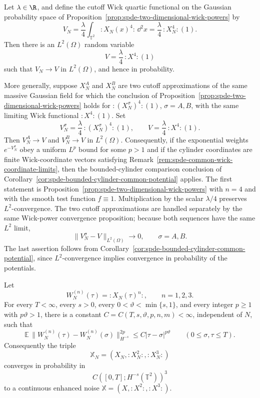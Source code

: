 \begin{remark}
\label{rem:spde-wick-quartic-potential-convergence}
Let \(\lambda\in\R\), and define the cutoff Wick quartic functional on the
Gaussian probability space of
Proposition~\ref{prop:spde-two-dimensional-wick-powers} by
\[
  V_N=\frac{\lambda}{4}\int_{\mathbb T^2}:\!X_N(x)^4\!:\,\dd^2x
  =
  \frac{\lambda}{4}\,:\!X_N^4\!:(1).
\]
Then there is an \(L^2(\Omega)\) random variable
\[
  V=\frac{\lambda}{4}\,:\!X^4\!:(1)
\]
such that \(V_N\to V\) in \(L^2(\Omega)\), and hence in probability.

More generally, suppose \(X_N^A\) and \(X_N^B\) are two cutoff
approximations of the same massive Gaussian field for which the conclusion
of Proposition~\ref{prop:spde-two-dimensional-wick-powers} holds for
\(:\!(X_N^\sigma)^4\!:(1)\), \(\sigma=A,B\), with the same limiting Wick
functional \(:\!X^4\!:(1)\).  Set
\[
  V_N^\sigma=\frac{\lambda}{4}\,:\!(X_N^\sigma)^4\!:(1),
  \qquad
  V=\frac{\lambda}{4}\,:\!X^4\!:(1).
\]
Then \(V_N^A\to V\) and \(V_N^B\to V\) in \(L^2(\Omega)\).  Consequently,
if the exponential weights \(e^{-V_N^\sigma}\) obey a uniform \(L^p\) bound
for some \(p>1\) and if the cylinder coordinates are finite Wick-coordinate
vectors satisfying
Remark~\ref{rem:spde-common-wick-coordinate-limits}, then the
bounded-cylinder comparison conclusion of
Corollary~\ref{cor:spde-bounded-cylinder-common-potential} applies.
The first statement is Proposition~\ref{prop:spde-two-dimensional-wick-powers}
with \(n=4\) and with the smooth test function \(f\equiv1\).  Multiplication
by the scalar \(\lambda/4\) preserves \(L^2\)-convergence.  The
two cutoff approximations are handled separately by the same Wick-power
convergence proposition; because both sequences have the same \(L^2\) limit,
\[
  \|V_N^\sigma-V\|_{L^2(\Omega)}\longrightarrow0,
  \qquad \sigma=A,B.
\]
The last assertion follows from
Corollary~\ref{cor:spde-bounded-cylinder-common-potential}, since
\(L^2\)-convergence implies convergence in probability of the potentials.
\end{remark}

\begin{proposition}
\label{prop:spde-two-dimensional-enhanced-noise-path-convergence}
Let
\[
  W_N^{(n)}(\tau)=:\!X_N(\tau)^n\!:,
  \qquad n=1,2,3 .
\]
For every \(T<\infty\), every \(s>0\), every
\(0<\vartheta<\min\{s,1\}\), and every integer \(p\geq1\) with
\(p\vartheta>1\), there is a constant
\(C=C(T,s,\vartheta,p,n,m)<\infty\), independent of \(N\), such that
\begin{equation}
  \mathbb E\,
  \|W_N^{(n)}(\tau)-W_N^{(n)}(\sigma)\|_{H^{-s}}^{2p}
  \leq
  C|\tau-\sigma|^{p\vartheta}
  \qquad
  (0\leq\sigma,\tau\leq T).
  \label{eq:spde-two-dimensional-wick-path-increment-bound}
\end{equation}
Consequently the triple
\[
  \mathbb X_N=(X_N,:\!X_N^2\!:,:\!X_N^3\!:)
\]
converges in probability in
\[
  C([0,T];H^{-s}(\mathbb T^2))^3
\]
to a continuous enhanced noise
\(\mathbb X=(X,:\!X^2\!:,:\!X^3\!:)\).
\end{proposition}

